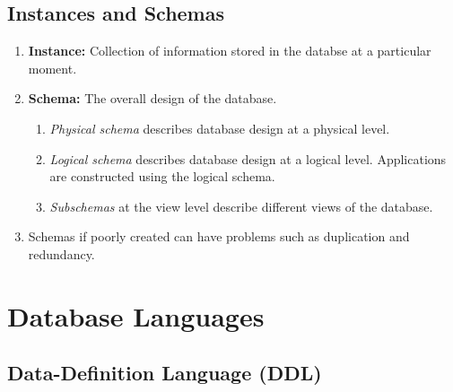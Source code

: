 \documentclass[journal,12pt,twocolumn]{IEEEtran}
\begin{document}
\subsection{Instances and Schemas}

\begin{enumerate}
    \item \textbf{Instance:} Collection of information stored in the databse 
    at a particular moment.
    \item \textbf{Schema:} The overall design of the database.
    \begin{enumerate}
        \item \textit{Physical schema} describes database design at a physical 
        level.
        \item \textit{Logical schema} describes database design at a logical 
        level. Applications are constructed using the logical schema.
        \item \textit{Subschemas} at the view level describe different views of 
        the database.
    \end{enumerate}
    \item Schemas if poorly created can have problems such as duplication and 
    redundancy.
\end{enumerate}

\section{Database Languages}

\subsection{Data-Definition Language (DDL)}
\end{document}
